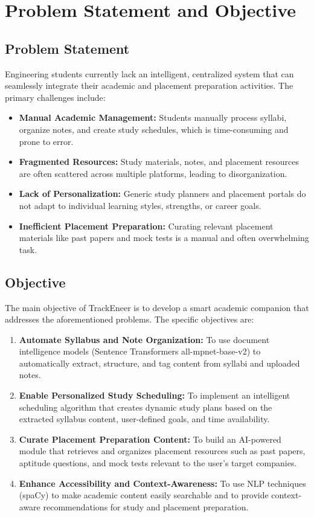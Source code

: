 \documentclass[conference]{IEEEtran}
\begin{document}
\section{Problem Statement and Objective}
\subsection{Problem Statement}
Engineering students currently lack an intelligent, centralized system that can seamlessly integrate their academic and placement preparation activities. The primary challenges include:
\begin{itemize}
    \item \textbf{Manual Academic Management:} Students manually process syllabi, organize notes, and create study schedules, which is time-consuming and prone to error.
    \item \textbf{Fragmented Resources:} Study materials, notes, and placement resources are often scattered across multiple platforms, leading to disorganization.
    \item \textbf{Lack of Personalization:} Generic study planners and placement portals do not adapt to individual learning styles, strengths, or career goals.
    \item \textbf{Inefficient Placement Preparation:} Curating relevant placement materials like past papers and mock tests is a manual and often overwhelming task.
\end{itemize}

\subsection{Objective}
The main objective of TrackEneer is to develop a smart academic companion that addresses the aforementioned problems. The specific objectives are:
\begin{enumerate}
    \item \textbf{Automate Syllabus and Note Organization:} To use document intelligence models (Sentence Transformers all-mpnet-base-v2) to automatically extract, structure, and tag content from syllabi and uploaded notes.
    \item \textbf{Enable Personalized Study Scheduling:} To implement an intelligent scheduling algorithm that creates dynamic study plans based on the extracted syllabus content, user-defined goals, and time availability.
    \item \textbf{Curate Placement Preparation Content:} To build an AI-powered module that retrieves and organizes placement resources such as past papers, aptitude questions, and mock tests relevant to the user's target companies.
    \item \textbf{Enhance Accessibility and Context-Awareness:} To use NLP techniques (spaCy) to make academic content easily searchable and to provide context-aware recommendations for study and placement preparation.
\end{enumerate}
\end{document}
